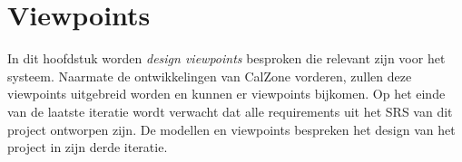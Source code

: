 \chapter{Viewpoints}
\label{chap:viewpoints}

In dit hoofdstuk worden \emph{design viewpoints} besproken die relevant zijn voor het systeem. 
Naarmate de ontwikkelingen van CalZone vorderen, zullen deze viewpoints uitgebreid worden en kunnen er viewpoints bijkomen. 
Op het einde van de laatste iteratie wordt verwacht dat alle requirements uit het SRS van dit project ontworpen zijn. 
De modellen en viewpoints bespreken het design van het project in zijn derde iteratie.




